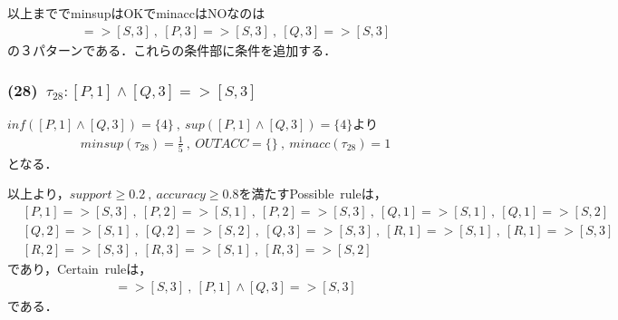 \documentclass[a4paper,12pt]{jarticle}
\begin{document}
\vspace{10mm}
以上まででminsupはOKでminaccはNOなのは
%
\begin{align*}
 [P,1]=>[S,3]~,~[P,3]=>[S,3]~,~[Q,3]=>[S,3]
\end{align*}
%
の３パターンである．これらの条件部に条件を追加する．
\subsubsection*{(28)~$\tau_{28}:[P,1]\land[Q,3]=>[S,3]$}
$inf([P,1]\land[Q,3])=\{4\}~,~sup([P,1]\land[Q,3])=\{4\}$より
%
\begin{align*}
 minsup(\tau_{28})=\frac{1}{5}~,~OUTACC=\{\}~,~minacc(\tau_{28})=1
\end{align*}
%
となる．

以上より，$support\geq0.2~,~accuracy\geq0.8$を満たすPossible~ruleは，
%
\begin{align*}
 &[P,1]=>[S,3]~,~[P,2]=>[S,1]~,~[P,2]=>[S,3]~,~[Q,1]=>[S,1]~,~[Q,1]=>[S,2] \\
 &[Q,2]=>[S,1]~,~[Q,2]=>[S,2]~,~[Q,3]=>[S,3]~,~[R,1]=>[S,1]~,~[R,1]=>[S,3] \\
 &[R,2]=>[S,3]~,~[R,3]=>[S,1]~,~[R,3]=>[S,2]
\end{align*}
%
であり，Certain~ruleは，
%
\begin{align*}
 [R,2]=>[S,3]~,~[P,1]\land[Q,3]=>[S,3]
\end{align*}
%
である．
\end{document}
